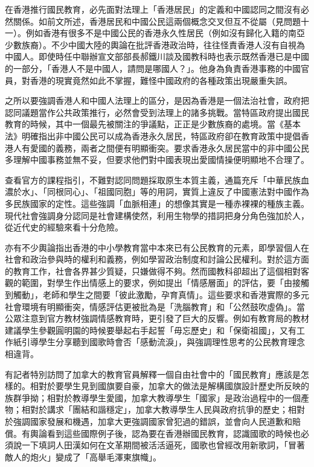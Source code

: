 在香港推行國民教育，必先面對法理上「香港居民」的定義和中國認同之間沒有必然關係。如前文所述，香港居民和中國公民這兩個概念交叉但互不從屬（見問題十一）。例如香港有很多不是中國公民的香港永久性居民（例如沒有歸化入籍的南亞少數族裔）。不少中國大陸的輿論在批評香港政治時，往往怪責香港人沒有自視為中國人。即使時任中聯辦宣文部部長郝鐵川談及國教科時也表示既然香港已是中國的一部分，「香港人不是中國人，請問是哪國人？」。他身為負責香港事務的中國官員，對香港的現實竟然如此不掌握，難怪中國政府的各種政策出現嚴重失誤。

之所以要強調香港人和中國人法理上的區分，是因為香港是一個法治社會，政府把認同議題當作公共政策推行，必然會受到法理上的諸多挑戰。當特區政府提出國民教育的時候，其中一個最先被關注的爭議點，正正是少數族裔的處境。當《基本法》明確指出非中國公民可以成為香港永久居民，特區政府卻在教育政策中提倡香港人有愛國的義務，兩者之間便有明顯衝突。要求香港永久居民當中的非中國公民多理解中國事務並無不妥，但要求他們對中國表現出愛國情操便明顯地不合理了。

查看官方的課程指引，不難對認同問題採取原生本質主義，通篇充斥「中華民族血濃於水」、「同根同心」、「祖國同胞」等的用詞，實質上違反了中國憲法對中國作為多民族國家的定性。這些強調「血脈相連」的想像其實是一種赤裸裸的種族主義。現代社會強調身分認同是社會建構使然，利用生物學的措詞把身分角色強加於人，從近代史的經驗來看十分危險。

亦有不少輿論指出香港的中小學教育當中本來已有公民教育的元素，即學習個人在社會和政治參與時的權利和義務，例如學習政治制度和討論公民權利。對於這方面的教育工作，社會各界甚少質疑，只嫌做得不夠。然而國教科卻超出了這個相對客觀的範圍，對學生作出情感上的要求，例如提出「情感層面」的評估，要「由接觸到觸動」，老師和學生之間要「彼此激勵，孕育真情」。這些要求和香港實際的多元社會環境有明顯衝突，情感評估更被批為是「洗腦教育」和「公然鼓吹虛偽」。當公眾注意到官方教材強調情感教育時，更引發了巨大的反響。例如有教育局的教材建議學生參觀圓明園的時候要舉起右手起誓「毋忘歷史」和「保衛祖國」，又有工作紙引導學生分享聽到國歌時會否「感動流淚」，與強調理性思考的公民教育理念相違背。

有記者特別訪問了加拿大的教育官員解釋一個自由社會中的「國民教育」應該是怎樣的。相對於要學生見到國旗要自豪，加拿大的做法是解構國旗設計歷史所反映的族群爭拗；相對於教導學生愛國，加拿大教導學生「國家」是政治過程中的一個產物；相對於講求「團結和諧穩定」，加拿大教導學生人民與政府抗爭的歷史；相對於強調國家發展和機遇，加拿大更強調國家曾犯過的錯誤，並會向人民道歉和賠償。有輿論看到這些國際例子後，認為要在香港辦國民教育，認識國歌的時候也必須說一下填詞人田漢如何在文革期間被活活逼死，國歌也曾經改用新歌詞，「冒著敵人的炮火」變成了「高舉毛澤東旗幟」。

